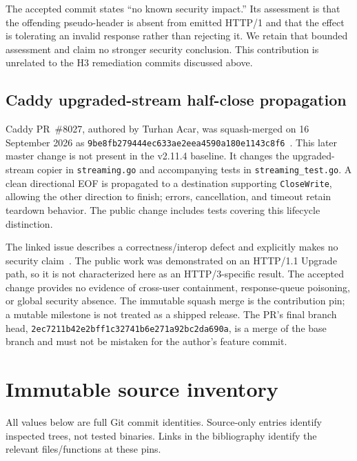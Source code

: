 \documentclass[11pt,letterpaper]{article}
\newcommand{\code}[1]{\nolinkurl{#1}}
\begin{document}
The accepted commit states ``no known security impact.'' Its assessment is that the offending pseudo-header is absent from emitted HTTP/1 and that the effect is tolerating an invalid response rather than rejecting it. We retain that bounded assessment and claim no stronger security conclusion. This contribution is unrelated to the H3 remediation commits discussed above.

\subsection{Caddy upgraded-stream half-close propagation}
Caddy PR~\#8027, authored by Turhan Acar, was squash-merged on 16 September 2026 as \code{9be8fb279444ec633ae2eea4590a180e1143c8f6}~\cite{caddypr,caddymerge}. This later master change is not present in the v2.11.4 baseline. It changes the upgraded-stream copier in \code{streaming.go} and accompanying tests in \code{streaming_test.go}. A clean directional EOF is propagated to a destination supporting \code{CloseWrite}, allowing the other direction to finish; errors, cancellation, and timeout retain teardown behavior. The public change includes tests covering this lifecycle distinction.

The linked issue describes a correctness/interop defect and explicitly makes no security claim~\cite{caddyissue}. The public work was demonstrated on an HTTP/1.1 Upgrade path, so it is not characterized here as an HTTP/3-specific result. The accepted change provides no evidence of cross-user containment, response-queue poisoning, or global security absence. The immutable squash merge is the contribution pin; a mutable milestone is not treated as a shipped release. The PR's final branch head, \code{2ec7211b42e2bff1c32741b6e271a92bc2da690a}, is a merge of the base branch and must not be mistaken for the author's feature commit.

\section{Immutable source inventory}\label{app:pins}
All values below are full Git commit identities. Source-only entries identify inspected trees, not tested binaries. Links in the bibliography identify the relevant files/functions at these pins.
\end{document}
